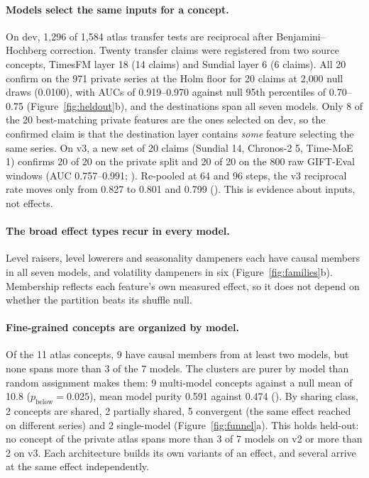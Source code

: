 \paragraph{Models select the same inputs for a concept.} On dev, 1{,}296 of 1{,}584 atlas transfer tests are reciprocal
after Benjamini--Hochberg correction. Twenty transfer claims were registered from two source concepts, TimesFM layer 18
(14 claims) and Sundial layer 6 (6 claims). All 20 confirm on the 971 private series at the Holm floor for 20 claims at
2{,}000 null draws (0.0100), with AUCs of 0.919--0.970 against null 95th percentiles of 0.70--0.75
(Figure~\ref{fig:heldout}b), and the destinations span all seven models. Only 8 of the 20 best-matching private features
are the ones selected on dev, so the confirmed claim is that the destination layer contains \emph{some} feature selecting
the same series. On v3, a new set of 20 claims (Sundial 14, Chronos-2 5, Time-MoE 1) confirms 20 of 20 on the private
split and 20 of 20 on the 800 raw GIFT-Eval windows (AUC 0.757--0.991; ). Re-pooled at 64 and 96 steps, the
v3 reciprocal rate moves only from 0.827 to 0.801 and 0.799 (). This is evidence about inputs, not effects.

\paragraph{The broad effect types recur in every model.} Level raisers, level lowerers and seasonality dampeners each
have causal members in all seven models, and volatility dampeners in six (Figure~\ref{fig:families}b). Membership
reflects each feature's own measured effect, so it does not depend on whether the partition beats its shuffle null.

\paragraph{Fine-grained concepts are organized by model.} Of the 11 atlas concepts, 9 have causal members from at least
two models, but none spans more than 3 of the 7 models. The clusters are purer by model than random assignment makes
them: 9 multi-model concepts against a null mean of 10.8 ($p_{\text{below}}=0.025$), mean model purity 0.591 against
0.474 (). By sharing class, 2 concepts are shared, 2 partially shared, 5 convergent (the same effect reached on
different series) and 2 single-model (Figure~\ref{fig:funnel}a). This holds held-out: no concept of the private atlas
spans more than 3 of 7 models on v2 or more than 2 on v3. Each architecture builds its own variants of an effect, and
several arrive at the same effect independently.

